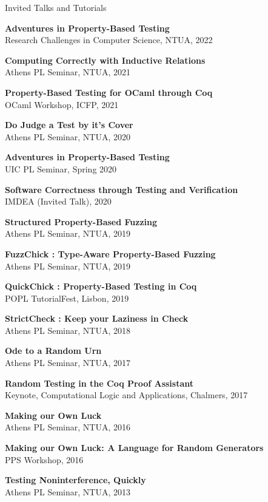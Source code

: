 \documentclass{resume} %
\begin{document}

\newcommand{\talk}[3]{
  {\bf #1} \\ %
  {#3}
  }

\newcommand{\apls}[1]{Athens PL Seminar, NTUA, #1}

\begin{rSection}{Invited Talks and Tutorials}

\talk{Adventures in Property-Based Testing}
     {}
     {Research Challenges in Computer Science, NTUA, 2022}

\talk{Computing Correctly with Inductive Relations}
     {}
     {Athens PL Seminar, NTUA, 2021}

\talk{Property-Based Testing for OCaml through Coq}     
     {}
     {OCaml Workshop, ICFP, 2021}

\talk{Do Judge a Test by it's Cover}
     {}
     {Athens PL Seminar, NTUA, 2020}
     
\talk{Adventures in Property-Based Testing}
     {}
     {UIC PL Seminar, Spring 2020}
  
\talk{Software Correctness through Testing and Verification}
     {}
     {IMDEA (Invited Talk), 2020}
  
\talk{Structured Property-Based Fuzzing}
     {}
     {Athens PL Seminar, NTUA, 2019}

\talk{FuzzChick : Type-Aware Property-Based Fuzzing}
    {}
    {\apls{2019}}
  
\talk{QuickChick : Property-Based Testing in Coq}
    {QuickChickTutorial.pdf}
    {POPL TutorialFest, Lisbon, 2019}

\talk{StrictCheck : Keep your Laziness in Check}
     {}
     {Athens PL Seminar, NTUA, 2018}

\talk{Ode to a Random Urn}
     {}
     {Athens PL Seminar, NTUA, 2017}

\talk{Random Testing in the Coq Proof Assistant}
     {InvitedCLA.pdf}
     {Keynote, Computational Logic and Applications, Chalmers, 2017}

\talk{Making our Own Luck}
     {}
     {Athens PL Seminar, NTUA, 2016}

\talk{Making our Own Luck: A Language for Random Generators}
     {}
     {PPS Workshop, 2016}

\talk{Testing Noninterference, Quickly}
     {}
     {Athens PL Seminar, NTUA, 2013}
     
\end{rSection}
\end{document}
